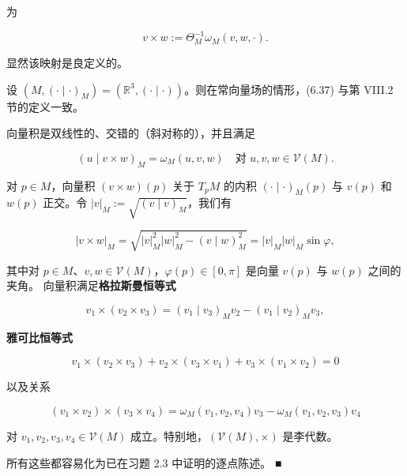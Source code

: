 为

\begin{equation}
v\times w := \Theta_{M}^{-1}\omega_{M}(v,w,\cdot) .\tag{6.37}
\end{equation}

显然该映射是良定义的。

\begin{remark}

\begin{items}
\item

设 $ (M,(\cdot\mid\cdot)_{M}) = (\mathbb{R}^{3},(\cdot\mid\cdot)) $。则在常向量场的情形，(6.37) 与第 VIII.2 节的定义一致。

\item

向量积是双线性的、交错的（斜对称的），并且满足

\begin{equation}
(u\mid v\times w)_{M} = \omega_{M}(u,v,w) \quad \text{对 } u, v, w \in \mathcal{V}(M) .\tag{6.38}
\end{equation}

对 $ p \in M $，向量积 $ (v\times w)(p) $ 关于 $ T_{p}M $ 的内积 $ (\cdot\mid\cdot)_{M}(p) $ 与 $ v(p) $ 和 $ w(p) $ 正交。令 $ |v|_{M} := \sqrt{(v\mid v)_{M}} $，我们有

\[
|v\times w|_{M} = \sqrt{|v|_{M}^{2}|w|_{M}^{2} - (v\mid w)_{M}^{2}} = |v|_{M}|w|_{M}\sin\varphi,
\]

其中对 $ p \in M $、$ v, w \in \mathcal{V}(M) $，$ \varphi(p) \in [0,\pi] $ 是向量 $ v(p) $ 与 $ w(p) $ 之间的夹角。
向量积满足\textbf{格拉斯曼恒等式}

\[
v_{1}\times(v_{2}\times v_{3}) = (v_{1}\mid v_{3})_{M}v_{2} - (v_{1}\mid v_{2})_{M}v_{3},
\]

\textbf{雅可比恒等式}

\[
v_{1}\times(v_{2}\times v_{3}) + v_{2}\times(v_{3}\times v_{1}) + v_{3}\times(v_{1}\times v_{2}) = 0
\]

以及关系

\[
(v_{1}\times v_{2})\times(v_{3}\times v_{4}) = \omega_{M}(v_{1},v_{2},v_{4})v_{3} - \omega_{M}(v_{1},v_{2},v_{3})v_{4}
\]

对 $ v_{1}, v_{2}, v_{3}, v_{4} \in \mathcal{V}(M) $ 成立。特别地，$ (\mathcal{V}(M),\times) $ 是李代数。

\proofhead
所有这些都容易化为已在习题 2.3 中证明的逐点陈述。 \nobreak\hspace{0.35em}■
\item


\end{items}
\end{remark}
